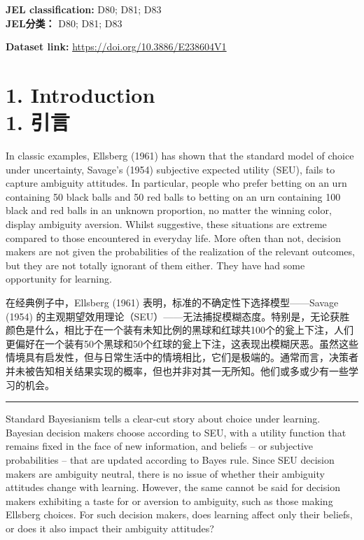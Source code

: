 \documentclass[12pt,a4paper]{article}
\newenvironment{original}
  {\par\vspace{0.5em}\noindent\color{black}\ignorespaces}
  {\par\vspace{0.3em}}
\newenvironment{translation}
  {\par\noindent\color{transblue}\ignorespaces}
  {\par\vspace{0.8em}\hrule\vspace{0.5em}}
\newcommand{\bilingualsection}[2]{%
  \section{\texorpdfstring{#1 \\[0.3em] {\large\color{transblue}#2}}{#1}}
}
\begin{document}
\vspace{0.5em}
\noindent\textbf{JEL classification:} D80; D81; D83 \\
{\color{transblue}\textbf{JEL分类：} D80; D81; D83}

\vspace{1em}
\noindent\textbf{Dataset link:} \url{https://doi.org/10.3886/E238604V1}

\newpage%
\bilingualsection{1. Introduction}{1. 引言}

\begin{original}
In classic examples, Ellsberg (1961) has shown that the standard model of choice under uncertainty, Savage's (1954) subjective expected utility (SEU), fails to capture ambiguity attitudes. In particular, people who prefer betting on an urn containing 50 black balls and 50 red balls to betting on an urn containing 100 black and red balls in an unknown proportion, no matter the winning color, display ambiguity aversion. Whilst suggestive, these situations are extreme compared to those encountered in everyday life. More often than not, decision makers are not given the probabilities of the realization of the relevant outcomes, but they are not totally ignorant of them either. They have had some opportunity for learning.
\end{original}

\begin{translation}
在经典例子中，Ellsberg (1961) 表明，标准的不确定性下选择模型——Savage (1954) 的主观期望效用理论（SEU）——无法捕捉模糊态度。特别是，无论获胜颜色是什么，相比于在一个装有未知比例的黑球和红球共100个的瓮上下注，人们更偏好在一个装有50个黑球和50个红球的瓮上下注，这表现出模糊厌恶。虽然这些情境具有启发性，但与日常生活中的情境相比，它们是极端的。通常而言，决策者并未被告知相关结果实现的概率，但也并非对其一无所知。他们或多或少有一些学习的机会。
\end{translation}

\begin{original}
Standard Bayesianism tells a clear-cut story about choice under learning. Bayesian decision makers choose according to SEU, with a utility function that remains fixed in the face of new information, and beliefs -- or subjective probabilities -- that are updated according to Bayes rule. Since SEU decision makers are ambiguity neutral, there is no issue of whether their ambiguity attitudes change with learning. However, the same cannot be said for decision makers exhibiting a taste for or aversion to ambiguity, such as those making Ellsberg choices. For such decision makers, does learning affect only their beliefs, or does it also impact their ambiguity attitudes?
\end{original}
\end{document}
